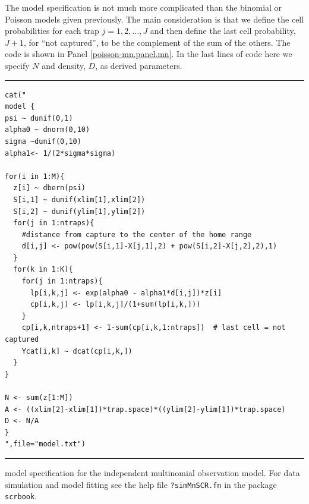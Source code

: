 The model specification is not much more complicated than the binomial
or Poisson models given previously. The main consideration is that we
define the cell probabilities for each trap $j=1,2,\dots,J$ and then
define the last cell probability, $J+1$, for ``not captured'', to be
the complement of the sum of the others. The code is shown in Panel
\ref{poisson-mn.panel.mn}.  In the last lines of code here we specify
$N$ and density, $D$, as derived parameters.

\begin{panel}[htp]
\centering
\rule[0.15in]{\textwidth}{.03in}
{\small
\begin{verbatim}
cat("
model {
psi ~ dunif(0,1)
alpha0 ~ dnorm(0,10)
sigma ~dunif(0,10)
alpha1<- 1/(2*sigma*sigma)

for(i in 1:M){
  z[i] ~ dbern(psi)
  S[i,1] ~ dunif(xlim[1],xlim[2])
  S[i,2] ~ dunif(ylim[1],ylim[2])
  for(j in 1:ntraps){
    #distance from capture to the center of the home range
    d[i,j] <- pow(pow(S[i,1]-X[j,1],2) + pow(S[i,2]-X[j,2],2),1)
  }
  for(k in 1:K){
    for(j in 1:ntraps){
      lp[i,k,j] <- exp(alpha0 - alpha1*d[i,j])*z[i]
      cp[i,k,j] <- lp[i,k,j]/(1+sum(lp[i,k,]))
    }
    cp[i,k,ntraps+1] <- 1-sum(cp[i,k,1:ntraps])  # last cell = not captured
    Ycat[i,k] ~ dcat(cp[i,k,])
  }
}

N <- sum(z[1:M])
A <- ((xlim[2]-xlim[1])*trap.space)*((ylim[2]-ylim[1])*trap.space)
D <- N/A
}
",file="model.txt")

\end{verbatim}
}
\rule[-0.15in]{\textwidth}{.03in}
\caption{
\winbugs model specification for the independent multinomial
observation model. For data simulation and model fitting see the
help file \mbox{\tt ?simMnSCR.fn} in the \R package \mbox{\tt scrbook}.
}
\label{poisson-mn.panel.mn}
\end{panel}

